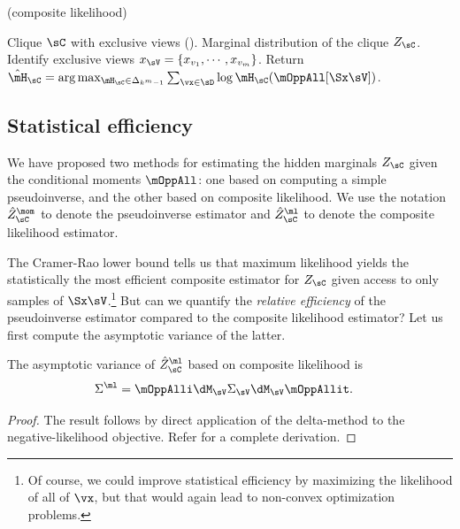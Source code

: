 \begin{algorithm}
  \caption{\LearnClique (composite likelihood)}
  \label{algo:piecewise}
  \begin{algorithmic}
    \REQUIRE Clique $\sC$ with exclusive views ().
    \ENSURE Marginal distribution of the clique $Z_\sC$.
\STATE Identify exclusive views $x_\sV = \{x_{v_1}, \cdots, x_{v_m}\}$.
\STATE Return $\hat \mH_\sC = \arg\max_{\mH_\sC \in \Delta_{k^m-1}} \sum_{\vx \in \sD} \log \mH_\sC(\mOppAll[\Sx \sV])$.
  \end{algorithmic}
\end{algorithm}

\subsection{Statistical efficiency}

We have proposed two methods for estimating the hidden marginals $Z_\sC$ given
the conditional moments $\mOppAll$: one based on computing a simple pseudoinverse,
and the other based on composite likelihood.
We use the notation $\hat Z^\mom_\sC$ to denote the pseudoinverse
  estimator and $\hat Z^\ml_\sC$ to denote the composite likelihood
  estimator.

The Cramer-Rao lower bound tells us that maximum likelihood yields
the statistically the most efficient composite estimator for $Z_\sC$
given access to only samples of $\Sx\sV$.\footnote{Of course, we could improve statistical efficiency
by maximizing the likelihood of all of $\vx$, but that would again lead to non-convex optimization problems.}
But can we quantify the \emph{relative efficiency} of the pseudoinverse estimator
compared to the composite likelihood estimator?
Let us first compute the asymptotic variance of the latter.

\begin{lemma}
  \label{lem:pw-variance}
  The asymptotic variance of $\hat Z^\ml_{\sC}$ based on composite likelihood is
  \begin{align*}
    \Sigma^{\ml} &= \mOppAlli \dM_\sV \Sigma_\sV \dM_\sV \mOppAllit.
  \end{align*}
\end{lemma}
\begin{proof}
  The result follows by direct application of the delta-method
  \cite{vaart98asymptotic} to the negative-likelihood objective. Refer
   for a complete derivation.
\end{proof}

